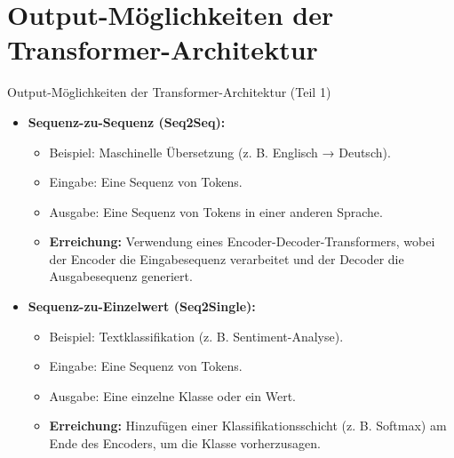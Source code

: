 \documentclass[aspectratio=1610, xcolor=dvipsnames, 9pt]{beamer}
\begin{document}
\section{Output-Möglichkeiten der Transformer-Architektur}

\begin{frame}{Output-Möglichkeiten der Transformer-Architektur (Teil 1)}
  \begin{itemize}
    \item \textbf{Sequenz-zu-Sequenz (Seq2Seq):}
      \begin{itemize}
        \item Beispiel: Maschinelle Übersetzung (z. B. Englisch → Deutsch).
        \item Eingabe: Eine Sequenz von Tokens.
        \item Ausgabe: Eine Sequenz von Tokens in einer anderen Sprache.
        \item \textbf{Erreichung:} Verwendung eines Encoder-Decoder-Transformers, wobei der Encoder die Eingabesequenz verarbeitet und der Decoder die Ausgabesequenz generiert.
      \end{itemize}
    \item \textbf{Sequenz-zu-Einzelwert (Seq2Single):}
      \begin{itemize}
        \item Beispiel: Textklassifikation (z. B. Sentiment-Analyse).
        \item Eingabe: Eine Sequenz von Tokens.
        \item Ausgabe: Eine einzelne Klasse oder ein Wert.
        \item \textbf{Erreichung:} Hinzufügen einer Klassifikationsschicht (z. B. Softmax) am Ende des Encoders, um die Klasse vorherzusagen.
      \end{itemize}
  \end{itemize}
\end{frame}
\end{document}
